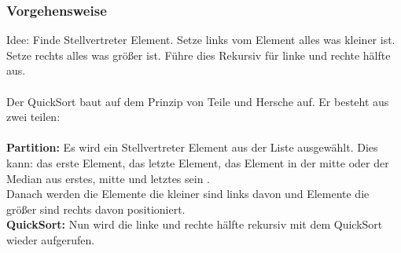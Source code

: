 \documentclass{article}
\begin{document}
\subsubsection{Vorgehensweise}
Idee: Finde Stellvertreter Element. Setze links vom Element alles was kleiner ist. Setze rechts alles was größer ist. Führe dies Rekursiv für linke und rechte hälfte aus.\\
\\
Der QuickSort baut auf dem Prinzip von Teile und Hersche auf. Er besteht aus zwei teilen:\\ \\
\textbf{Partition:} Es wird ein Stellvertreter Element aus der Liste ausgewählt. Dies kann: das erste Element, das letzte Element, das Element in der mitte oder der Median aus erstes, mitte und letztes sein \cite{sedgewick1978pivot}.\\ Danach werden die Elemente die kleiner sind links davon und Elemente die größer sind rechts davon positioniert.\\
\textbf{QuickSort:} Nun wird die linke und rechte hälfte rekursiv mit dem QuickSort wieder aufgerufen. %
\end{document}

